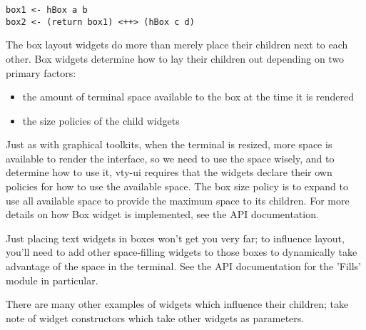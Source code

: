 \begin{verbatim}
box1 <- hBox a b
box2 <- (return box1) <++> (hBox c d)
\end{verbatim}

The box layout widgets do more than merely place their children next to
each other.  Box widgets determine how to lay their children out
depending on two primary factors:

\begin{itemize}
\item the amount of terminal space available to the box at the time it
      is rendered
\item the size policies of the child widgets
\end{itemize}

Just as with graphical toolkits, when the terminal is resized, more
space is available to render the interface, so we need to use the space
wisely, and to determine how to use it, vty-ui requires that the widgets
declare their own policies for how to use the available space.  The box
size policy is to expand to use all available space to provide the
maximum space to its children.  For more details on how Box widget is
implemented, see the API documentation.

Just placing text widgets in boxes won't get you very far; to influence
layout, you'll need to add other space-filling widgets to those boxes to
dynamically take advantage of the space in the terminal.  See the API
documentation for the 'Fills' module in particular.

There are many other examples of widgets which influence their children;
take note of widget constructors which take other widgets as parameters.
